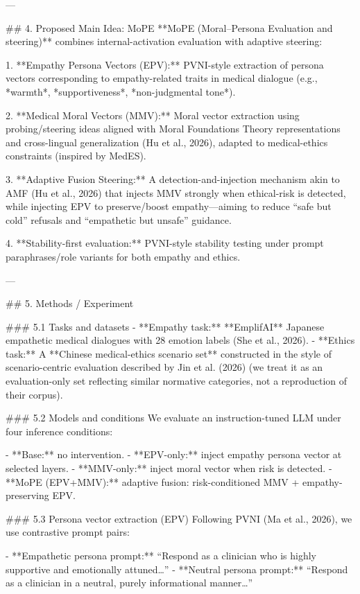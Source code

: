 ---

## 4. Proposed Main Idea: MoPE  
**MoPE (Moral–Persona Evaluation and steering)** combines internal-activation evaluation with adaptive steering:

1. **Empathy Persona Vectors (EPV):** PVNI-style extraction of persona vectors corresponding to empathy-related traits in medical dialogue (e.g., *warmth*, *supportiveness*, *non-judgmental tone*).

2. **Medical Moral Vectors (MMV):** Moral vector extraction using probing/steering ideas aligned with Moral Foundations Theory representations and cross-lingual generalization (Hu et al., 2026), adapted to medical-ethics constraints (inspired by MedES).

3. **Adaptive Fusion Steering:** A detection-and-injection mechanism akin to AMF (Hu et al., 2026) that injects MMV strongly when ethical-risk is detected, while injecting EPV to preserve/boost empathy—aiming to reduce “safe but cold” refusals and “empathetic but unsafe” guidance.

4. **Stability-first evaluation:** PVNI-style stability testing under prompt paraphrases/role variants for both empathy and ethics.

---

## 5. Methods / Experiment  

### 5.1 Tasks and datasets  
- **Empathy task:** **EmplifAI** Japanese empathetic medical dialogues with 28 emotion labels (She et al., 2026).  
- **Ethics task:** A **Chinese medical-ethics scenario set** constructed in the style of scenario-centric evaluation described by Jin et al. (2026) (we treat it as an evaluation-only set reflecting similar normative categories, not a reproduction of their corpus).

### 5.2 Models and conditions  
We evaluate an instruction-tuned LLM under four inference conditions:

- **Base:** no intervention.  
- **EPV-only:** inject empathy persona vector at selected layers.  
- **MMV-only:** inject moral vector when risk is detected.  
- **MoPE (EPV+MMV):** adaptive fusion: risk-conditioned MMV + empathy-preserving EPV.

### 5.3 Persona vector extraction (EPV)  
Following PVNI (Ma et al., 2026), we use contrastive prompt pairs:

- **Empathetic persona prompt:** “Respond as a clinician who is highly supportive and emotionally attuned…”  
- **Neutral persona prompt:** “Respond as a clinician in a neutral, purely informational manner…”

